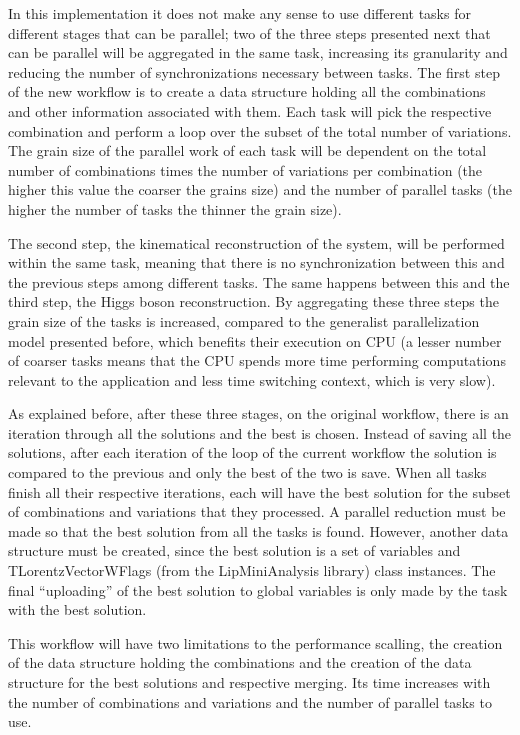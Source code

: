 In this implementation it does not make any sense to use different tasks for different stages that can be parallel; two of the three steps presented next that can be parallel will be aggregated in the same task, increasing its granularity and reducing the number of synchronizations necessary between tasks. The first step of the new workflow is to create a data structure holding all the combinations and other information associated with them. Each task will pick the respective combination and perform a loop over the subset of the total number of variations. The grain size of the parallel work of each task will be dependent on the total number of combinations times the number of variations per combination (the higher this value the coarser the grains size) and the number of parallel tasks (the higher the number of tasks the thinner the grain size).

The second step, the kinematical reconstruction of the \ttbar system, will be performed within the same task, meaning that there is no synchronization between this and the previous steps among different tasks. The same happens between this and the third step, the Higgs boson reconstruction. By aggregating these three steps the grain size of the tasks is increased, compared to the generalist parallelization model presented before, which benefits their execution on CPU (a lesser number of coarser tasks means that the CPU spends more time performing computations relevant to the application and less time switching context, which is very slow).

As explained before, after these three stages, on the original workflow, there is an iteration through all the solutions and the best is chosen. Instead of saving all the solutions, after each iteration of the loop of the current workflow the solution is compared to the previous and only the best of the two is save. When all tasks finish all their respective iterations, each will have the best solution for the subset of combinations and variations that they processed. A parallel reduction must be made so that the best solution from all the tasks is found. However, another data structure must be created, since the best solution is a set of variables and TLorentzVectorWFlags (from the LipMiniAnalysis library) class instances. The final ``uploading'' of the best solution to global variables is only made by the task with the best solution.

This workflow will have two limitations to the performance scalling, the creation of the data structure holding the combinations and the creation of the data structure for the best solutions and respective merging. Its time increases with the number of combinations and variations and the number of parallel tasks to use.

